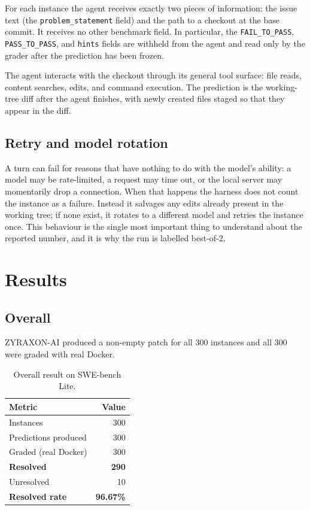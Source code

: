 \documentclass[11pt,a4paper]{article}
\begin{document}
For each instance the agent receives exactly two pieces of information: the issue text
(the \texttt{problem\_statement} field) and the path to a checkout at the base commit.
It receives no other benchmark field. In particular, the \texttt{FAIL\_TO\_PASS},
\texttt{PASS\_TO\_PASS}, and \texttt{hints} fields are withheld from the agent and read
only by the grader after the prediction has been frozen.

The agent interacts with the checkout through its general tool surface: file reads,
content searches, edits, and command execution. The prediction is the working-tree diff
after the agent finishes, with newly created files staged so that they appear in the
diff.

\subsection{Retry and model rotation}

A turn can fail for reasons that have nothing to do with the model's ability: a
model may be rate-limited, a request may time out, or the local server may
momentarily drop a connection. When that happens the harness does not count the instance
as a failure. Instead it salvages any edits already present in the working tree; if none
exist, it rotates to a different model and retries the instance once. This behaviour is
the single most important thing to understand about the reported number, and it is why
the run is labelled best-of-2.

\section{Results}
\label{sec:results}

\subsection{Overall}

ZYRAXON-AI produced a non-empty patch for all 300 instances and all 300 were graded with
real Docker.

\begin{table}[H]
\centering
\caption{Overall result on SWE-bench Lite.}
\label{tab:overall}
\begin{tabular}{@{}lr@{}}
\toprule
Metric & Value \\
\midrule
Instances & 300 \\
Predictions produced & 300 \\
Graded (real Docker) & 300 \\
\textbf{Resolved} & \textbf{290} \\
Unresolved & 10 \\
\textbf{Resolved rate} & \textbf{96.67\%} \\
\bottomrule
\end{tabular}
\end{table}
\end{document}
